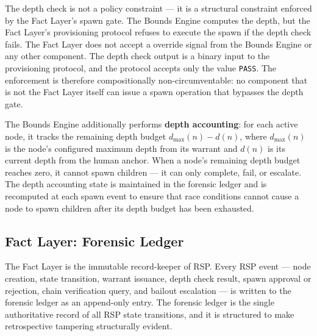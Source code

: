 The depth check is not a policy constraint — it is a structural constraint enforced by the Fact Layer's spawn gate. The Bounds Engine computes the depth, but the Fact Layer's provisioning protocol refuses to execute the spawn if the depth check fails. The Fact Layer does not accept a override signal from the Bounds Engine or any other component. The depth check output is a binary input to the provisioning protocol, and the protocol accepts only the value \texttt{PASS}. The enforcement is therefore compositionally non-circumventable: no component that is not the Fact Layer itself can issue a spawn operation that bypasses the depth gate.

The Bounds Engine additionally performs \textbf{depth accounting}: for each active node, it tracks the remaining depth budget $d_{\max}(n) - d(n)$, where $d_{\max}(n)$ is the node's configured maximum depth from its warrant and $d(n)$ is its current depth from the human anchor. When a node's remaining depth budget reaches zero, it cannot spawn children — it can only complete, fail, or escalate. The depth accounting state is maintained in the forensic ledger and is recomputed at each spawn event to ensure that race conditions cannot cause a node to spawn children after its depth budget has been exhausted.

\subsection{Fact Layer: Forensic Ledger}
\label{sec:fact-layer-forensic-ledger}

The Fact Layer is the immutable record-keeper of RSP. Every RSP event — node creation, state transition, warrant issuance, depth check result, spawn approval or rejection, chain verification query, and bailout escalation — is written to the forensic ledger as an append-only entry. The forensic ledger is the single authoritative record of all RSP state transitions, and it is structured to make retrospective tampering structurally evident.

